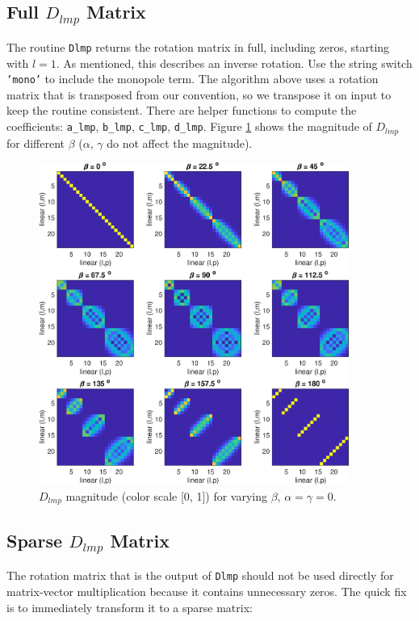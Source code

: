 \subsection{Full $D_{lmp}$ Matrix}

The routine \texttt{Dlmp} returns the rotation matrix in full, including zeros, starting with $l=1$. As mentioned, this describes an inverse rotation. Use the string switch \texttt{'mono'} to include the monopole term. The algorithm above uses a rotation matrix that is transposed from our convention, so we transpose it on input to keep the routine consistent. There are helper functions to compute the coefficients: \texttt{a\_lmp}, \texttt{b\_lmp}, \texttt{c\_lmp}, \texttt{d\_lmp}.  Figure \ref{fig1} shows the magnitude of $D_{lmp}$ for different $\beta$ ($\alpha$, $\gamma$ do not affect the magnitude).  

\begin{figure}[H] 
   \centering
   \includegraphics[width=4in]{Rotation/Figures/Dlmp} 
   \caption{$D_{lmp}$ magnitude (color scale [0, 1]) for varying $\beta$, $\alpha = \gamma = 0$.}
   \label{fig1}
\end{figure}

{\footnotesize
{}
}


\newpage

\subsection{Sparse $D_{lmp}$ Matrix}

The rotation matrix that is the output of \texttt{Dlmp} should not be used directly for matrix-vector multiplication because it contains unnecessary zeros. The quick fix is to immediately transform it to a sparse matrix:

